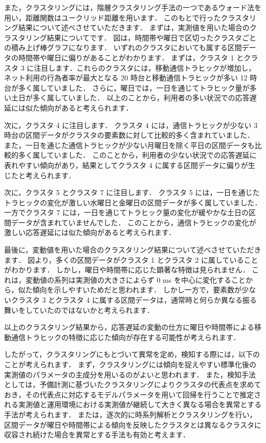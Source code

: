 \documentclass[a4j]{jarticle}
\begin{document}
また，クラスタリングには，階層クラスタリング手法の一つであるウォード法を用い，距離関数はユークリッド距離を用います．
このもとで行ったクラスタリング結果について述べさせていただきます．
まずは，実測値を用いた場合のクラスタリング結果についてです．
図は，時間帯や曜日で区切ったクラスタごとの積み上げ棒グラフになります．
いずれのクラスタにおいても属する区間データの時間帯や曜日に偏りがあることがわかります．
まずは，クラスタ 1 とクラスタ 3 に注目します．これらのクラスタには，移動通信トラヒックが増加し，ネット利用の行為者率が最大となる 20 時台と移動通信トラヒックが多い 12 時台が多く属していました．
さらに，曜日では，一日を通じてトラヒック量が多い土日が多く属していました．
以上のことから，利用者の多い状況での応答遅延には似た傾向があると考えられます．

次に，クラスタ 4 に注目します．
クラスタ 4 には，通信トラヒックが少ない 3 時台の区間データがクラスタの要素数に対して比較的多く含まれていました．
また，一日を通じた通信トラヒックが少ない月曜日を除く平日の区間データも比較的多く属していました．
このことから，利用者の少ない状況での応答遅延に表れやすい傾向があり，結果としてクラスタ 4 に属する区間データに偏りが生じたと考えられます．

次に，クラスタ 5 とクラスタ 7 に注目します．
クラスタ 5 には，一日を通じたトラヒックの変化が激しい水曜日と金曜日の区間データが多く属していました．
一方でクラスタ 7 には，一日を通じてトラヒック量の変化が緩やかな土日の区間データが含まれていませんでした．
このことから，通信トラヒックの変化が激しい応答遅延には似た傾向があると考えられます．

最後に，変動値を用いた場合のクラスタリング結果について述べさせていただきます．
図より，多くの区間データがクラスタ 1 とクラスタ 2 に属していることがわかります．
しかし，曜日や時間帯に応じた顕著な特徴は見られません．
これは，変動値の系列は実測値の大きさによらず 0 ms を中心に変化することから，似た傾向を示しやすいためだと思われます．
しかし一方で，要素数が少ないクラスタ 3 とクラスタ 4 に属する区間データは，通常時と何らか異なる振る舞いをしていたのではないかと考えられます．

以上のクラスタリング結果から，応答遅延の変動の仕方に曜日や時間帯による移動通信トラヒックの特徴に応じた傾向が存在する可能性が考えられます．

したがって，クラスタリングにもとづいて異常を定め，検知する際には，以下のことが考えられます．
まず，クラスタリングには傾向を捉えやすい標準化後の実測値のパラメータの主成分を用いるのがよいと思われます．
また，検知手法としては，予備計測に基づいたクラスタリングによりクラスタの代表点を求めておき，その代表点に対応するモデルパラメータを用いて回帰を行うことで推定される実測値と運用環境における実測値が継続して大きく異なる場合を異常とする手法が考えられます．
または，逐次的に時系列解析とクラスタリングを行い，区間データが曜日や時間帯による傾向を反映したクラスタとは異なるクラスタに収容され続けた場合を異常とする手法も有効と考えます．
\end{document}
